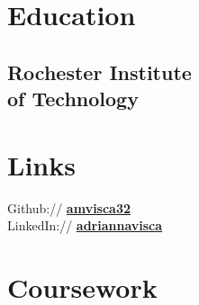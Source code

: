 \documentclass[]{deedy-resume-openfont}
\begin{document}
%
%
\lastupdated

%
%

%
%

\begin{minipage}[t]{0.33\textwidth} 


\section{Education} 

\subsection{Rochester Institute\\ of Technology}
\sectionsep


\section{Links} 
Github:// \href{https://github.com/amvisca32}{\bf amvisca32} \\
LinkedIn://  \href{https://www.linkedin.com/in/adriannavisca/}{\bf adriannavisca} \\
\sectionsep


\section{Coursework}


\end{minipage}
\end{document}
